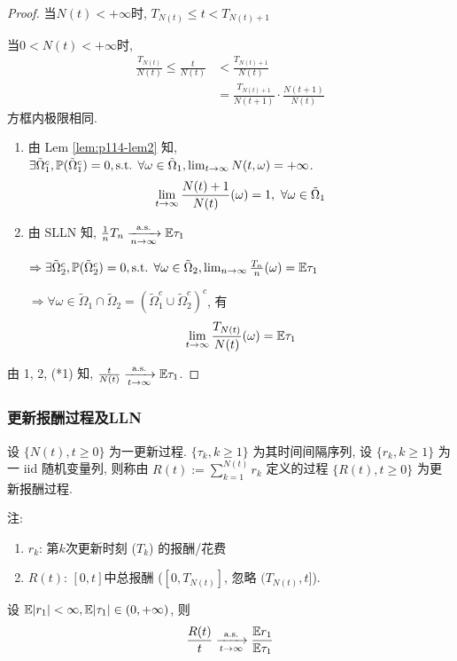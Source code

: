 \begin{proof}
    当$N(t)<+\infty$时, $T_{N(t)}\leq t<T_{N(t)+1}$

    当$0<N(t)<+\infty$时,
    \[
    \begin{aligned}
        \boxed{\frac{T_{N(t)}}{N(t)}}\leq \frac{t}{N(t)}&<\frac{T_{N(t)+1}}{N(t)}\\
        &=\boxed{\frac{T_{N(t)+1}}{N(t+1)}}\cdot \frac{N(t+1)}{N(t)}
    \end{aligned}
    \tag{*1}
    \]
    方框内极限相同.
    \begin{enumerate}
        \item 由 Lem \ref{lem:p114-lem2} 知, $\exists \tilde{\Omega}_1^c,\mathbb{P}(\tilde{\Omega}_1^c)=0,\text{s.t. } \forall \omega\in \tilde{\Omega}_1, \lim_{t \to \infty}N(t, \omega)=+\infty$.
        \[
        \lim_{t \to \infty}\frac{N(t)+1}{N(t)}(\omega)=1, \ \forall \omega\in\tilde{\Omega}_1
        \]
        \item 由 SLLN 知, $\frac{1}{n}T_n\xrightarrow[n\to\infty]{\text{a.s.}}\mathbb E\tau_1$
        
        $\Rightarrow \exists \tilde{\Omega}_2^c, \mathbb{P}(\tilde{\Omega}_2^c)=0,\text{s.t. } \forall \omega\in\tilde{\Omega}_2, \lim_{n \to \infty}\frac{T_n}{n}(\omega)=\mathbb E\tau_1$

        $\Rightarrow \forall \omega\in\tilde{\Omega}_1\cap \tilde{\Omega}_2=(\tilde{\Omega}_1^c\cup \tilde{\Omega}_2^c)^c$, 有
        \[
        \lim_{t \to \infty}\frac{T_{N(t)}}{N(t)}(\omega)=\mathbb E\tau_1
        \]
    \end{enumerate}
    由 1, 2, (*1) 知, $\frac{t}{N(t)}\xrightarrow[t\to\infty]{\text{a.s.}}\mathbb E\tau_1$.
\end{proof}

\subsubsection{更新报酬过程及LLN}

\begin{definition}
    设 $\{N(t),t\geq 0\}$ 为一更新过程. $\{\tau_k, k\geq 1\}$ 为其时间间隔序列, 设 $\{r_k,k\geq 1\}$ 为一 iid 随机变量列, 则称由 $R(t):=\sum_{k=1}^{N(t)}r_k$ 定义的过程 $\{R(t),t\geq 0\}$ 为更新报酬过程.
\end{definition}
注:
\begin{enumerate}
    \item $r_k$: 第$k$次更新时刻 ($T_k$) 的报酬/花费
    \item $R(t)$: $[0,t]$中总报酬 ($[0,T_{N(t)}]$, 忽略 $(T_{N(t)},t]$).
\end{enumerate}

\begin{theorem}[更新报酬过程的LLN]\label{thm:p116-thm3.3}
    设 $\mathbb E|r_1|<\infty,\mathbb E|\tau_1|\in (0,+\infty)$, 则
    \[
    \frac{R(t)}{t}\xrightarrow[t\to\infty]{\text{a.s.}}\frac{\mathbb E r_1}{\mathbb E\tau_1}
    \]
\end{theorem}

